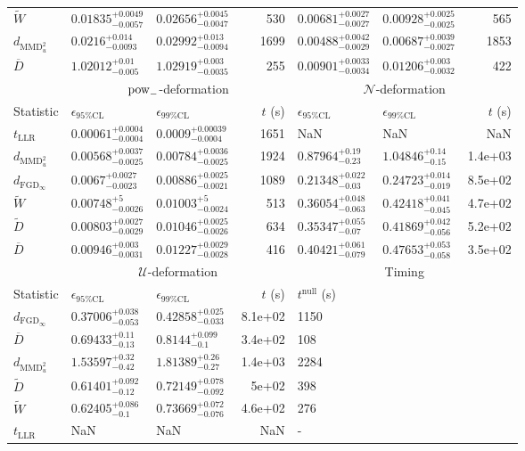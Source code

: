 \begin{tabular}{l|llr|llr}
	$\widetilde{W}$ & $0.01835_{-0.0057}^{+0.0049}$ & $0.02656_{-0.0047}^{+0.0045}$ & 530 & $0.00681_{-0.0027}^{+0.0027}$ & $0.00928_{-0.0025}^{+0.0025}$ & 565 \\
	$d_{\mathrm{MMD}^{2}_{u}}$ & $0.0216_{-0.0093}^{+0.014}$ & $0.02992_{-0.0094}^{+0.013}$ & 1699 & $0.00488_{-0.0029}^{+0.0042}$ & $0.00687_{-0.0027}^{+0.0039}$ & 1853 \\
	$\overline{D}$ & $1.02012_{-0.005}^{+0.01}$ & $1.02919_{-0.0035}^{+0.003}$ & 255 & $0.00901_{-0.0034}^{+0.0033}$ & $0.01206_{-0.0032}^{+0.003}$ & 422 \\
	\toprule
	\multicolumn{1}{c}{} & \multicolumn{3}{c}{$\rm{pow}_{-}$-deformation} & \multicolumn{3}{c}{$\mathcal{N}$-deformation} \\
	Statistic & $\epsilon_{95\%\mathrm{CL}}$ & $\epsilon_{99\%\mathrm{CL}}$ & $t$ (s) & $\epsilon_{95\%\mathrm{CL}}$ & $\epsilon_{99\%\mathrm{CL}}$ & $t$ (s) \\
	\midrule
	$t_{\mathrm{LLR}}$ & $0.00061_{-0.0004}^{+0.0004}$ & $0.0009_{-0.0004}^{+0.00039}$ & 1651 & NaN & NaN & NaN \\
	$d_{\mathrm{MMD}^{2}_{u}}$ & $0.00568_{-0.0025}^{+0.0037}$ & $0.00784_{-0.0025}^{+0.0036}$ & 1924 & $0.87964_{-0.23}^{+0.19}$ & $1.04846_{-0.15}^{+0.14}$ & 1.4e+03 \\
	$d_{\mathrm{FGD}_{\infty}}$ & $0.0067_{-0.0023}^{+0.0027}$ & $0.00886_{-0.0021}^{+0.0025}$ & 1089 & $0.21348_{-0.03}^{+0.022}$ & $0.24723_{-0.019}^{+0.014}$ & 8.5e+02 \\
	$\widetilde{W}$ & $0.00748_{-0.0026}^{+5}$ & $0.01003_{-0.0024}^{+5}$ & 513 & $0.36054_{-0.063}^{+0.048}$ & $0.42418_{-0.045}^{+0.041}$ & 4.7e+02 \\
	$\widetilde{D}$ & $0.00803_{-0.0029}^{+0.0027}$ & $0.01046_{-0.0026}^{+0.0025}$ & 634 & $0.35347_{-0.07}^{+0.055}$ & $0.41869_{-0.056}^{+0.042}$ & 5.2e+02 \\
	$\overline{D}$ & $0.00946_{-0.0031}^{+0.003}$ & $0.01227_{-0.0028}^{+0.0029}$ & 416 & $0.40421_{-0.079}^{+0.061}$ & $0.47653_{-0.058}^{+0.053}$ & 3.5e+02 \\
	\toprule
	\multicolumn{1}{c}{} & \multicolumn{3}{c}{$\mathcal{U}$-deformation} & \multicolumn{3}{c}{Timing} \\
	Statistic & $\epsilon_{95\%\mathrm{CL}}$ & $\epsilon_{99\%\mathrm{CL}}$ & $t$ (s) & $t^{\mathrm{null}}$ (s) \\
	\midrule
	$d_{\mathrm{FGD}_{\infty}}$ & $0.37006_{-0.053}^{+0.038}$ & $0.42858_{-0.033}^{+0.025}$ & 8.1e+02 & 1150 \\
	$\overline{D}$ & $0.69433_{-0.13}^{+0.11}$ & $0.8144_{-0.1}^{+0.099}$ & 3.4e+02 & 108 \\
	$d_{\mathrm{MMD}^{2}_{u}}$ & $1.53597_{-0.42}^{+0.32}$ & $1.81389_{-0.27}^{+0.26}$ & 1.4e+03 & 2284 \\
	$\widetilde{D}$ & $0.61401_{-0.12}^{+0.092}$ & $0.72149_{-0.092}^{+0.078}$ & 5e+02 & 398 \\
	$\widetilde{W}$ & $0.62405_{-0.1}^{+0.086}$ & $0.73669_{-0.076}^{+0.072}$ & 4.6e+02 & 276 \\
	$t_{\mathrm{LLR}}$ & NaN & NaN & NaN & - \\
	\bottomrule
\end{tabular}